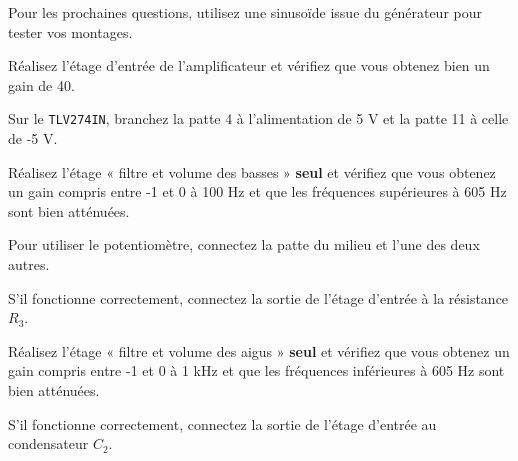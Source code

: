 \documentclass{../template/labo}
\begin{document}

Pour les prochaines questions, utilisez une sinusoïde issue du générateur pour tester vos montages.
\Question
{
	Réalisez l'étage d'entrée de l'amplificateur et vérifiez que vous obtenez bien un gain de 40.
	\begin{astuce}
		Sur le \texttt{TLV274IN}, branchez la patte 4 à l'alimentation de 5 V et la patte 11 à celle de -5 V.
	\end{astuce}
}
{}

\Question
{
	Réalisez l'étage « filtre et volume des basses » \textbf{seul} et vérifiez que vous obtenez un gain compris entre -1 et 0 à 100 Hz et que les fréquences supérieures à 605 Hz sont bien atténuées.

	\begin{astuce}
		Pour utiliser le potentiomètre, connectez la patte du milieu et l'une des deux autres.
	\end{astuce}

	S'il fonctionne correctement, connectez la sortie de l'étage d'entrée à la résistance $R_3$.
}
{}

\Question
{
	Réalisez l'étage « filtre et volume des aigus » \textbf{seul} et vérifiez que vous obtenez un gain compris entre -1 et 0 à 1 kHz et que les fréquences inférieures à 605 Hz sont bien atténuées.

	S'il fonctionne correctement, connectez la sortie de l'étage d'entrée au condensateur $C_2$.
}
{}
\end{document}
